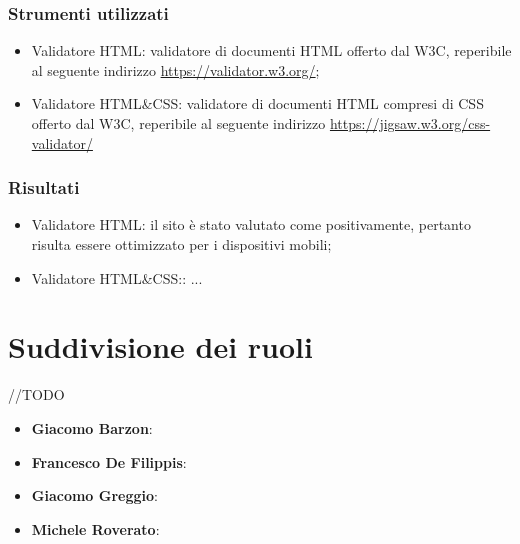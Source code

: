\documentclass[12pt]{article}
\begin{document}
	\subsubsection{Strumenti utilizzati}
	\begin{itemize}
		\item Validatore HTML: validatore di documenti HTML offerto dal W3C, reperibile al seguente indirizzo \url{https://validator.w3.org/};
		\item Validatore HTML\&CSS: validatore di documenti HTML compresi di CSS offerto dal W3C, reperibile al seguente indirizzo \url{https://jigsaw.w3.org/css-validator/}
	\end{itemize}
	\subsubsection{Risultati}
		\begin{itemize}
			\item Validatore HTML: il sito è stato valutato come positivamente, pertanto risulta essere ottimizzato per i dispositivi mobili;
			\item Validatore HTML\&CSS:: ...
		\end{itemize}
	
	\section{Suddivisione dei ruoli}
	//TODO
	\begin{itemize}
		\item \textbf{Giacomo Barzon}:
		\item \textbf{Francesco De Filippis}: 
		\item \textbf{Giacomo Greggio}:
		\item \textbf{Michele Roverato}:
	\end{itemize}
\end{document}
